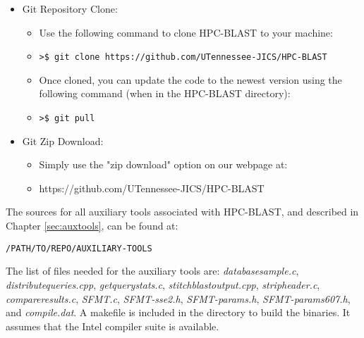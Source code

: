 \documentclass[10pt]{article}
\begin{document}
\begin{itemize}
  \item Git Repository Clone:
  \begin{itemize}
    \item Use the following command to clone HPC-BLAST to your machine:
      \item \verb|>$ git clone https://github.com/UTennessee-JICS/HPC-BLAST|
      \item Once cloned, you can update the code to the newest version using the following command (when in the HPC-BLAST directory):
      \item \verb|>$ git pull|
    \end{itemize}
  \item Git Zip Download:
  \begin{itemize}
    \item  Simply use the "zip download" option on our webpage at:
    \item https://github.com/UTennessee-JICS/HPC-BLAST
  \end{itemize}
\end{itemize}



\noindent The sources for all auxiliary tools associated with HPC-BLAST, and described in Chapter \ref{sec:auxtools}, can be found at:
\begin{verbatim}
/PATH/TO/REPO/AUXILIARY-TOOLS
\end{verbatim}

\noindent The list of files needed for the auxiliary tools are: \emph{database\textunderscore sample.c}, \emph{distribute\textunderscore queries.cpp}, \emph{get\textunderscore query\textunderscore stats.c}, \emph{stitch\textunderscore blast\textunderscore output.cpp}, \emph{strip\textunderscore header.c},
\emph{compare\textunderscore results.c}, \emph{SFMT.c}, \emph{SFMT-sse2.h}, \emph{SFMT-params.h}, \emph{SFMT-params607.h}, and \emph{compile.dat}.  A makefile is included in the directory
to build the binaries. It assumes that the Intel compiler suite is available.
\end{document}
